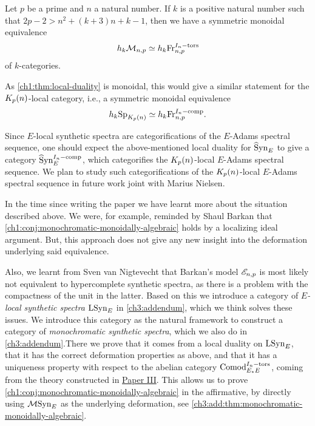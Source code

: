 \begin{conjecture}
    \label{ch1:conj:monochromatic-monoidally-algebraic}
    Let $p$ be a prime and $n$ a natural number. If $k$ is a positive natural number such that $2p-2>n^2+(k+3)n+k-1$, then we have a symmetric monoidal equivalence 
    \[h_k \mathcal{M}_{n,p}\simeq h_k \mathrm{Fr}_{n,p}^{I_n-\mathrm{tors}}\]
    of $k$-categories. 
\end{conjecture}



As \cref{ch1:thm:local-duality} is monoidal, this would give a similar statement for the ${K_p(n)}$-local category, i.e., a symmetric monoidal equivalence 
\[h_k \mathrm{Sp}_{{K_p(n)}}\simeq h_k \mathrm{Fr}_{n,p}^{I_n-\mathrm{comp}}.\]

Since $E$-local synthetic spectra are categorifications of the $E$-Adams spectral sequence, one should expect the above-mentioned local duality for $\widehat{\mathrm{S}}\mathrm{yn}_{E}$ to give a category $\widehat{\mathrm{S}}\mathrm{yn}_{E}^{I_n-\mathrm{comp}}$, which categorifies the ${K_p(n)}$-local $E$-Adams spectral sequence. We plan to study such categorifications of the ${K_p(n)}$-local $E$-Adams spectral sequence in future work joint with Marius Nielsen. 

\begin{addendum}
    \label{ch1:add:shaul-comment-monoidal}
    In the time since writing the paper we have learnt more about the situation described above. We were, for example, reminded by Shaul Barkan that \cref{ch1:conj:monochromatic-monoidally-algebraic} holds by a localizing ideal argument. But, this approach does not give any new insight into the deformation underlying said equivalence. 
    
    Also, we learnt from Sven van Nigtevecht that Barkan's model $\mathscr{E}_{n,p}$ is most likely not equivalent to hypercomplete synthetic spectra, as there is a problem with the compactness of the unit in the latter. Based on this we introduce a category of \emph{$E$-local synthetic spectra} $\mathrm{LSyn}_{E}$ in \cref{ch3:addendum}, which we think solves these issues. We introduce this category as the natural framework to construct a category of \emph{monochromatic synthetic spectra}, which we also do in \cref{ch3:addendum}.There we prove that it comes from a local duality on $\mathrm{LSyn}_{E}$, that it has the correct deformation properties as above, and that it has a uniqueness property with respect to the abelian category $\mathrm{Comod}_{E_*E}^{I_n-\mathrm{tors}}$, coming from the theory constructed in \hyperref[ch3]{Paper III}. This allows us to prove \cref{ch1:conj:monochromatic-monoidally-algebraic} in the affirmative, by directly using $\mathcal{M}\mathrm{Syn}_{E}$ as the underlying deformation, see \cref{ch3:add:thm:monochromatic-monoidally-algebraic}. 
\end{addendum}

